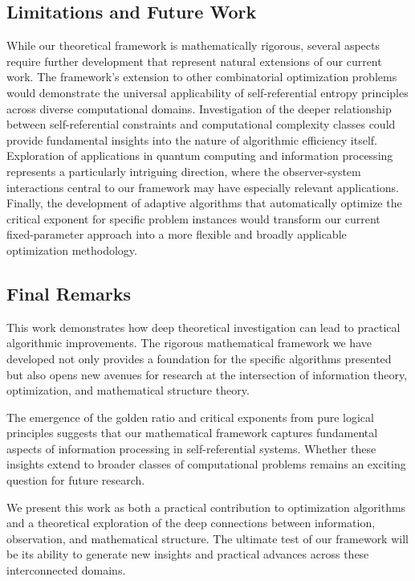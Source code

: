 \documentclass[11pt]{article}
\theoremstyle{remark}
\theoremstyle{definition}
\begin{document}
\subsection{Limitations and Future Work}

While our theoretical framework is mathematically rigorous, several aspects require further development that represent natural extensions of our current work. The framework's extension to other combinatorial optimization problems would demonstrate the universal applicability of self-referential entropy principles across diverse computational domains. Investigation of the deeper relationship between self-referential constraints and computational complexity classes could provide fundamental insights into the nature of algorithmic efficiency itself. Exploration of applications in quantum computing and information processing represents a particularly intriguing direction, where the observer-system interactions central to our framework may have especially relevant applications. Finally, the development of adaptive algorithms that automatically optimize the critical exponent for specific problem instances would transform our current fixed-parameter approach into a more flexible and broadly applicable optimization methodology.

\subsection{Final Remarks}

This work demonstrates how deep theoretical investigation can lead to practical algorithmic improvements. The rigorous mathematical framework we have developed not only provides a foundation for the specific algorithms presented but also opens new avenues for research at the intersection of information theory, optimization, and mathematical structure theory.

The emergence of the golden ratio and critical exponents from pure logical principles suggests that our mathematical framework captures fundamental aspects of information processing in self-referential systems. Whether these insights extend to broader classes of computational problems remains an exciting question for future research.

We present this work as both a practical contribution to optimization algorithms and a theoretical exploration of the deep connections between information, observation, and mathematical structure. The ultimate test of our framework will be its ability to generate new insights and practical advances across these interconnected domains.
\end{document}
